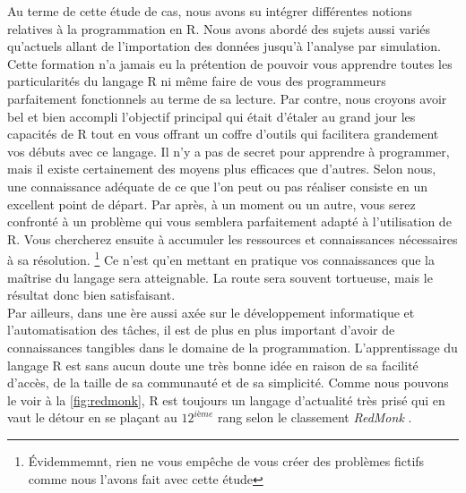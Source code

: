 Au terme de cette étude de cas, nous avons su intégrer différentes notions relatives à la programmation en R. Nous avons abordé des sujets aussi variés qu'actuels allant de l'importation des données jusqu'à l'analyse par simulation. \\

Cette formation n'a jamais eu la prétention de pouvoir vous apprendre toutes les particularités du langage R ni même faire de vous des programmeurs parfaitement fonctionnels au terme de sa lecture. Par contre, nous croyons avoir bel et bien accompli l'objectif principal qui était d'étaler au grand jour les capacités de R tout en vous offrant un coffre d'outils qui facilitera grandement vos débuts avec ce langage. Il n'y a pas de secret pour apprendre à programmer, mais il existe certainement des moyens plus efficaces que d'autres. Selon nous, une connaissance adéquate de ce que l'on peut ou pas réaliser consiste en un excellent point de départ. Par après, à un moment ou un autre, vous serez confronté à un problème qui vous semblera parfaitement adapté à l'utilisation de R. Vous chercherez ensuite à accumuler les ressources et connaissances nécessaires à sa résolution. \footnote{Évidemmemnt, rien ne vous empêche de vous créer des problèmes fictifs comme nous l'avons fait avec cette étude} Ce n'est qu'en mettant en pratique vos connaissances que la maîtrise du langage sera atteignable. La route sera souvent tortueuse, mais le résultat donc bien satisfaisant. \\

Par ailleurs, dans une ère aussi axée sur le développement informatique et l'automatisation des tâches, il est de plus en plus important d'avoir de connaissances tangibles dans le domaine de la programmation. L'apprentissage du langage R est sans aucun doute une très bonne idée en raison de sa facilité d'accès, de la taille de sa communauté et de sa simplicité. Comme nous pouvons le voir à la \autoref{fig:redmonk}, R est toujours un langage d'actualité très prisé qui en vaut le détour en se plaçant au $12^{ième}$ rang selon le classement \emph{RedMonk} \cite{codingGame}. \\


